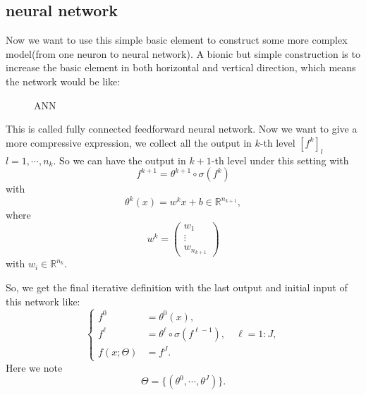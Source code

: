 \subsection{neural network}
Now we want to use this simple basic element to construct some more complex model(from one neuron to neural network). A bionic but simple construction is to increase the basic element in both horizontal and vertical direction, which means the network would be like:
\begin{figure}[!ht]
	\caption{ANN}
\end{figure}

This is called fully connected feedforward neural network. Now we want to give a more compressive expression, we collect all the output in $k$-th level $[f^{k}]_l$ $l = 1,\cdots, n_k$.
So we can have the output in $k+1$-th level under this setting with
\begin{equation}
{f}^{k+1} = \theta^{k+1}\circ \sigma (f^{k})
\end{equation}
with
\begin{equation}
\theta^k(x) = w^kx+b \in\mathbb{R}^{n_{k+1}},
\end{equation} 
where 
\begin{equation}
w^k= 
\begin{pmatrix}
w_1 \\
\vdots \\
w_{n_{k+1}}
\end{pmatrix}
\end{equation}
with $w_i \in \mathbb{R}^{n_k}$.

So, we get the final iterative definition with the last output and initial input of this network like:
\begin{equation}
\begin{cases}
f^{0} &= \theta^0(x), \\
f^{\ell} &= \theta^{\ell}\circ \sigma(f^{\ell-1}), \quad \ell = 1:J, \\
f(x;\Theta) &= f^J.
\end{cases}
\end{equation}
Here we note 
\begin{equation}
\Theta = \{ (\theta^0, \cdots, \theta^J) \}.
\end{equation}

